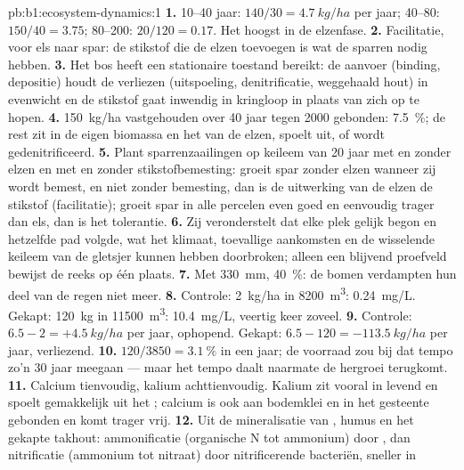\begin{solution}{pb:b1:ecosystem-dynamics:1}
\textbf{1.} 10--40 jaar: $140/30 = \qty{4.7}{kg/ha}$ per jaar; 40--80:
$150/40 = \num{3.75}$; 80--200: $20/120 = \num{0.17}$. Het hoogst in de
elzenfase.
\textbf{2.} Facilitatie, voor els naar spar: de stikstof die de elzen
toevoegen is wat de sparren nodig hebben.
\textbf{3.} Het bos heeft een stationaire toestand bereikt: de aanvoer
(binding, depositie) houdt de verliezen (uitspoeling, denitrificatie,
weggehaald hout) in evenwicht en de stikstof gaat inwendig in kringloop in
plaats van zich op te hopen.
\textbf{4.} \qty{150}{kg/ha} vastgehouden over 40 jaar tegen \num{2000}
gebonden: \qty{7.5}{\%}; de rest zit in de eigen biomassa en het 
van de elzen, spoelt uit, of wordt gedenitrificeerd.
\textbf{5.} Plant sparrenzaailingen op keileem van 20 jaar met en zonder
elzen en met en zonder stikstofbemesting: groeit spar zonder elzen wanneer
zij wordt bemest, en niet zonder bemesting, dan is de uitwerking van de elzen
de stikstof (facilitatie); groeit spar in alle percelen even goed en
eenvoudig trager dan els, dan is het tolerantie.
\textbf{6.} Zij veronderstelt dat elke plek gelijk begon en hetzelfde pad
volgde, wat het klimaat, toevallige aankomsten en de wisselende keileem van
de gletsjer kunnen hebben doorbroken; alleen een blijvend proefveld bewijst
de reeks op één plaats.
\textbf{7.} Met \qty{330}{mm}, \qty{40}{\%}: de bomen verdampten hun deel van
de regen niet meer.
\textbf{8.} Controle: \qty{2}{kg/ha} in \qty{8200}{m^3}: \qty{0.24}{mg/L}.
Gekapt: \qty{120}{kg} in \qty{11500}{m^3}: \qty{10.4}{mg/L}, veertig keer
zoveel.
\textbf{9.} Controle: $6.5 - 2 = +\qty{4.5}{kg/ha}$ per jaar, ophopend.
Gekapt: $6.5 - 120 = -\qty{113.5}{kg/ha}$ per jaar, verliezend.
\textbf{10.} $120/3850 = \qty{3.1}{\%}$ in een jaar; de voorraad zou bij dat
tempo zo'n \num{30} jaar meegaan --- maar het tempo daalt naarmate de
hergroei terugkomt.
\textbf{11.} Calcium tienvoudig, kalium achttienvoudig. Kalium zit vooral in
levend  en spoelt gemakkelijk uit het ; calcium is ook aan
bodemklei en in het gesteente gebonden en komt trager vrij.
\textbf{12.} Uit de mineralisatie van , humus en het gekapte
takhout: ammonificatie (organische N tot ammonium) door , dan
nitrificatie (ammonium tot nitraat) door nitrificerende bacteriën, sneller in

\end{solution}
